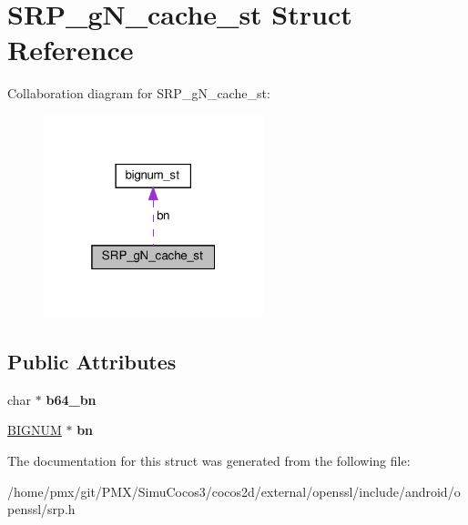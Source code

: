 \hypertarget{structSRP__gN__cache__st}{}\section{S\+R\+P\+\_\+g\+N\+\_\+cache\+\_\+st Struct Reference}
\label{structSRP__gN__cache__st}


Collaboration diagram for S\+R\+P\+\_\+g\+N\+\_\+cache\+\_\+st\+:
\nopagebreak
\begin{figure}[H]
\begin{center}
\leavevmode
\includegraphics[width=181pt]{structSRP__gN__cache__st__coll__graph}
\end{center}
\end{figure}
\subsection*{Public Attributes}
\begin{DoxyCompactItemize}
\item 
\mbox{\label{structSRP__gN__cache__st_a67902250dbf017585e0fe0656501355f}} 
char $\ast$ {\bfseries b64\+\_\+bn}
\item 
\mbox{\label{structSRP__gN__cache__st_a80b6bef68c03f6a8bdd82c0521ef6e5b}} 
\hyperlink{structbignum__st}{B\+I\+G\+N\+UM} $\ast$ {\bfseries bn}
\end{DoxyCompactItemize}


The documentation for this struct was generated from the following file\+:\begin{DoxyCompactItemize}
\item 
/home/pmx/git/\+P\+M\+X/\+Simu\+Cocos3/cocos2d/external/openssl/include/android/openssl/srp.\+h\end{DoxyCompactItemize}
